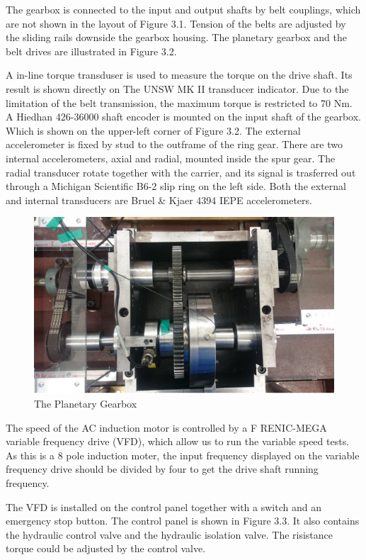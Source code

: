 The gearbox is connected to the input and output shafts by belt couplings, which are not shown in the layout of Figure 3.1. Tension of the belts are adjusted by the sliding rails downside the gearbox housing. The planetary gearbox and the belt drives are illustrated in Figure 3.2.

A in-line torque transduser is used to measure the torque on the drive shaft. Its result is shown directly on The UNSW MK II transducer indicator. Due to the limitation of the belt transmission, the maximum torque is restricted to 70 Nm.
A Hiedhan 426-36000 shaft encoder is mounted on the input shaft of the gearbox. Which is shown on the upper-left corner of Figure 3.2. 
The external accelerometer is fixed by stud to the outframe of the ring gear. There are two internal accelerometers, axial and radial, mounted inside the spur gear. The radial transducer rotate together with the carrier, and its signal is trasferred out through a Michigan Scientific B6-2 slip ring on the left side. Both the external and internal transducers are Bruel \& Kjaer 4394 IEPE accelerometers.

\begin{figure}
	\centering
	\includegraphics{gearbox}
	\caption{The Planetary Gearbox}
	\label{gearbox}
\end{figure}

The speed of the AC induction motor is controlled by a F		RENIC-MEGA variable frequency drive (VFD), which allow us to run the variable speed tests. As this is a 8 pole induction moter, the input frequency displayed on the variable frequency drive should be divided by four to get the drive shaft running frequency.

The VFD is installed on the control panel together with a switch and an emergency stop button. The control panel is shown in Figure 3.3. It also contains the hydraulic control valve and the hydraulic isolation valve. The risistance torque could be adjusted by the control valve.

